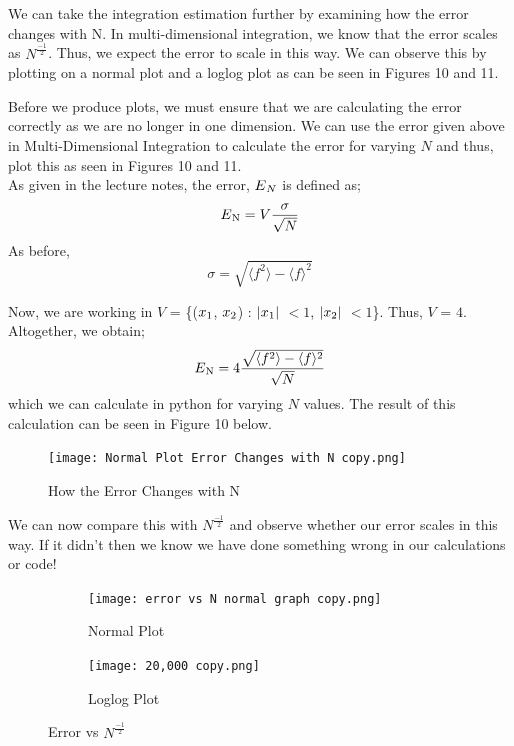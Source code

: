 \documentclass[12pt]{article}
\begin{document}
We can take the integration estimation further by examining how the error changes with N. In multi-dimensional integration, we know that the error scales as $N^{\frac{-1}{2}}$. Thus, we expect the error to scale in this way. We can observe this by plotting on a normal plot and a loglog plot as can be seen in Figures 10 and 11.

Before we produce plots, we must ensure that we are calculating the error correctly as we are no longer in one dimension. We can use the error given above in Multi-Dimensional Integration to calculate the error for varying $N$ and thus, plot this as seen in Figures 10 and 11. \\


As given in the lecture notes, the error, $E\textsubscript{$N$}$ is defined as;
 \begin{align} 
E\textsubscript{N} = V\frac{\sigma}{\sqrt{N}}
\end{align}
As before, 
\begin{equation}
\sigma =  \sqrt{{\langle f^2\rangle} - {\langle f\rangle ^2}}
\end{equation}

Now, we are working in $V$ = \{($x\textsubscript{1}$, $x\textsubscript{2}$) : $|x\textsubscript{1}|$ $< 1$, $|x\textsubscript{2}|$ $< 1$\}. Thus, $V$ = $4$.\\
Altogether, we obtain;
 \begin{align} 
E\textsubscript{N} = 4 \frac{\sqrt{{\langle f^2\rangle} - {\langle f\rangle ^2}}}{\sqrt{N}}
\end{align}
which we can calculate in python for varying $N$ values. The result of this calculation can be seen in Figure 10 below.

\begin{figure}[h!]
  \texttt{[image: Normal Plot Error Changes with N copy.png]}
  \caption{How the Error Changes with N}
  \label{fig:mc_randomness}
\end{figure}

We can now compare this with $N^{\frac{-1}{2}}$ and observe whether our error scales in this way. If it didn't then we know we have done something wrong in our calculations or code!

\begin{figure}[h]
\begin{subfigure}{0.5\textwidth}
\texttt{[image: error vs N normal graph copy.png]} 
\caption{Normal Plot}
\label{fig:subim1}
\end{subfigure}
\begin{subfigure}{0.5\textwidth}
\texttt{[image: 20,000 copy.png]}
\caption{Loglog Plot}
\label{fig:subim2}
\end{subfigure}
\caption{Error vs $N^{\frac{-1}{2}}$}
\label{fig:image2}
\end{figure}
\end{document}
